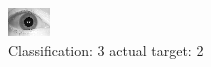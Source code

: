 \begin{figure}[h!]
\begin{center}
\includegraphics[width=0.60\columnwidth]{figures/ID1630_class_3_target_2.png}
\end{center}
\caption{ Classification: 3 actual target: 2}
\label{fig:ID1630_class_3_target_2}
\end{figure}
